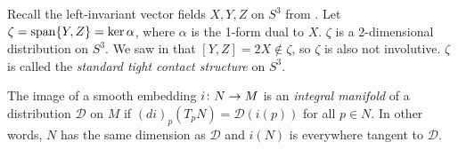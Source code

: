 \begin{example}
	Recall the left-invariant vector fields $X,Y,Z$ on $S^3$ from . Let $\zeta = \operatorname{span} \{Y,Z\} = \ker \alpha$, where $\alpha$ is the 1-form dual to $X$. $\zeta$ is a 2-dimensional distribution on $S^3$. We saw in  that $[Y,Z] = 2X \notin \zeta$, so $\zeta$ is also not involutive. $\zeta$ is called the \emph{standard tight contact structure} on $S^3$.
\end{example}

\begin{definition}\label{def:integral manifold}
	The image of a smooth embedding $i \colon\thinspace\! N \to M$ is an \emph{integral manifold} of a distribution $\mathcal{D}$ on $M$ if $(di)_p\left(T_pN\right) = \mathcal{D}(i(p))$ for all $p \in N$. In other words, $N$ has the same dimension as $\mathcal{D}$ and $i(N)$ is everywhere tangent to $\mathcal{D}$.
\end{definition}

